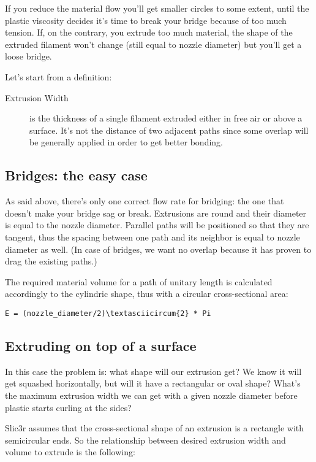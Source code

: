 If you reduce the material flow you'll get smaller circles to some extent, until the plastic viscosity decides it's time to break your bridge because of too much tension. If, on the contrary, you extrude too much material, the shape of the extruded filament won't change (still equal to nozzle diameter) but you'll get a loose bridge.

Let's start from a definition:

\begin{description}
\item[Extrusion Width] is the thickness of a single filament extruded either in free air or above a surface. It's not the distance of two adjacent paths since some overlap will be generally applied in order to get better bonding.
\end{description}

\subsection{Bridges: the easy case}
\label{sec:bridges}

As said above, there's only one correct flow rate for bridging: the one that doesn't make your bridge sag or break. Extrusions are round and their diameter is equal to the nozzle diameter. Parallel paths will be positioned so that they are tangent, thus the spacing between one path and its neighbor is equal to nozzle diameter as well. (In case of bridges, we want no overlap because it has proven to drag the existing paths.)

The required material volume for a path of unitary length is calculated accordingly to the cylindric shape, thus with a circular cross-sectional area:

\verb|E = (nozzle_diameter/2)\textasciicircum{2} * Pi|

\subsection{Extruding on top of a surface}
\label{sec:extruding_on_surface}

In this case the problem is: what shape will our extrusion get? We know it will get squashed horizontally, but will it have a rectangular or oval shape? What's the maximum extrusion width we can get with a given nozzle diameter before plastic starts curling at the sides?

Slic3r assumes that the cross-sectional shape of an extrusion is a rectangle with semicircular ends. So the relationship between desired extrusion width and volume to extrude is the following:

